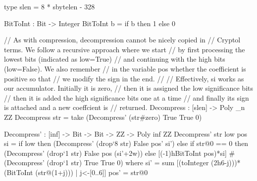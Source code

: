 \begin{code}
  type slen = 8 * sbytelen - 328
\end{code}

\begin{algorithm}[!htp]
\caption{$\decompress(\str, \slen)$ \hfill}\label{alg:decompress}
	\begin{algorithmic}[1]
	\If{$|\str| \neq \slen$}\label{line:fix} 
	\Return{$\bot$} \label{line:fix2}
	\EndIf
	\label{line:dbin} 
	\label{line:8}
	\EndWhile
	\label{line:zero} 
	\Return{$\bot$}\label{line:zero2}
	\EndIf
	\EndFor
	\label{line:trail} 
	\Return{$\bot$}\label{line:trail2} 
	\EndIf
	\end{algorithmic}
\end{algorithm}

\begin{code}
  BitToInt : Bit -> Integer
  BitToInt b = if b then 1 else 0

  // As with compression, decompression cannot be nicely copied in 
  // Cryptol terms. We follow a recursive approach where we start
  // by first processing the lowest bits (indicated as low=True)
  // and continuing with the high bits (low=False). We also remember
  // in the variable pos whether the coefficient is positive so that 
  // we modify the sign in the end.
  //
  // Effectively, si works as our accumulator. Initially it is zero,
  // then it is assigned the low significance bits
  // then it is added the high significance bits one at a time
  // and finally its sign is attached and a new coeffcient is 
  // returned.
  Decompress : [slen] -> Poly _n ZZ
  Decompress str = take (Decompress' (str#zero) True True 0)

  Decompress' : [inf] -> Bit -> Bit -> ZZ -> Poly inf ZZ
  Decompress' str low pos si =
    if low
    then (Decompress' (drop`{8} str) False pos' si')
    else
      if str@0 == 0
      then (Decompress' (drop`{1} str) False pos (si'+2^^7))
      else [(-1)^^(BitToInt pos)*si]
           # (Decompress' (drop`{1} str) True True 0)
    where
      si' = sum [(toInteger (2^^(6-j)))*(BitToInt (str@(1+j))) | j<-[0..6]]
      pos' = str@0
\end{code}

